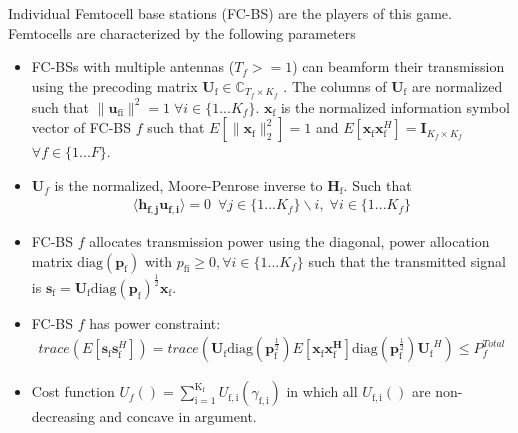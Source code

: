 \documentclass[12pt,a4paper]{report}
\begin{document}
Individual Femtocell base stations (FC-BS) are the players of this game.
\\
Femtocells are characterized by the following parameters
\begin{itemize}
\item 
	FC-BSs with multiple antennas ($T_f >=1$) can beamform their transmission using the precoding 	
	matrix $\mathbf{U}_{\mathrm{f}} \in \mathbb{C}_{T_f \times K_f}$ .
	The columns of $\mathbf{U}_{\mathrm{f}}$ are normalized such that 
	 $\|\mathbf{u}_{\mathrm{fi}}\|^2 =1 \;\forall i \in \{1 ... K_f\}$.
	 $\mathbf{x_{\mathrm{f}}}$ is the 		
	normalized information symbol vector of FC-BS $f$ such that $E[\|\mathbf{x}_{\mathrm{f}}
	\|_2^2]=1$ and $E[\mathbf{x}_{\mathrm{f}}\mathbf{x}_{\mathrm{f}}^H]=\mathbf{I}_{K_f \times K_f}$ $\forall f \in \{1 ... F\}$.
\\

\item 
$\mathbf{U}_f$ is the normalized, Moore-Penrose inverse to $\mathbf{H_\mathrm{f}}$.
Such that
\begin{gather*}
\langle \mathbf{h_{f,j}}\mathbf{u_{f,i}} \rangle =0\  \; \forall j \in \{1... K_f\}\backslash i ,\; \forall i \in \{1 ... K_f\}
\end{gather*}

\item  
	FC-BS $f$ allocates  transmission power using the diagonal, power allocation  	
	matrix $\mathrm{diag}(\mathbf{p}_{\mathrm{f}})$ with $p_{\mathrm{fi}} \geq 0, \forall i \in \{1 ... K_f\}$
such that the transmitted 		
	signal is 
	$\mathbf{s}_{\mathrm{f}	}= \mathbf{U_{\mathrm{f}}} 
	\mathrm{diag}(\mathbf{p}_{\mathrm{f}})^{\frac{1}{2}}
	\mathbf{x_{\mathrm{f}}}$.
\\
\item 
	FC-BS $f$ has power constraint:
	\begin{gather*}
	trace(E[\mathbf{s}_\mathrm{f}\mathbf{s}_\mathrm{f}^H]) =
	 trace(\mathbf{U_{\mathrm{f}}} 
	\mathrm{diag}(\mathbf{p}_{\mathrm{f}}^{\frac{1}{2}})
	E[\mathbf{x_{\mathrm{f}}}
	\mathbf{x_{\mathrm{f}}^H}]
	\mathrm{diag}(\mathbf{p}_{\mathrm{f}}^{\frac{1}{2}})
	\mathbf{U_{\mathrm{f}}}^H 
	)
	  \leq P^{Total}_{f} 
	  	\end{gather*}



\item 
	Cost function $U_f() =
	\sum_{\mathrm{i=1}}^{\mathrm{K_f}}
    	U_{\mathrm{f,i}}(\gamma_{\mathrm{f,i}}) $
    	in which all $U_{\mathrm{f,i}}()$ are non-decreasing and concave in argument.

\end{itemize}
\end{document}
